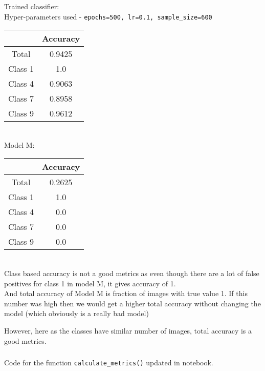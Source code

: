 \documentclass[12pt, fleqn]{article}
\begin{document}
\subsubsection{}
Trained classifier: \\
Hyper-parameters used - \texttt{epochs=500, lr=0.1, sample\_size=600} \\
\begin{tabular}{|c||c||}
  \hline
          & Accuracy \\
  \hline
  Total   & 0.9425   \\
  Class 1 & 1.0      \\
  Class 4 & 0.9063   \\
  Class 7 & 0.8958   \\
  Class 9 & 0.9612   \\
  \hline
\end{tabular} \\

Model M: \\
\begin{tabular}{|c||c||}
  \hline
          & Accuracy \\
  \hline
  Total   & 0.2625   \\
  Class 1 & 1.0      \\
  Class 4 & 0.0      \\
  Class 7 & 0.0      \\
  Class 9 & 0.0      \\
  \hline
\end{tabular} \\

Class based accuracy is not a good metrics as even though there are a lot of false positives for class 1 in model M, it gives accuracy of 1. \\
And total accuracy of Model M is fraction of images with true value 1. If this number was high then we would get a higher total accuracy without changing the model (which obviously is a really bad model)

However, here as the classes have similar number of images, total accuracy is a good metrics. \\

\subsubsection{}
Code for the function \verb!calculate_metrics()! updated in notebook. \\
\end{document}
